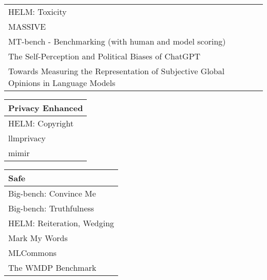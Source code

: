 \documentclass[fleqn]{article}
\begin{document}
\begin{table}[H]
\begin{tabular}{l}
		HELM: Toxicity \\
		MASSIVE \\
		MT-bench - Benchmarking (with human and model scoring) \\
		The Self-Perception and Political Biases of ChatGPT \\
		Towards Measuring the Representation of Subjective Global Opinions in Language Models \\
		\bottomrule
	\end{tabular}
	\newline
	\vspace{10pt}
	\newline
	\begin{tabular}{l}
		\toprule
		Privacy Enhanced \\
		\midrule
		HELM: Copyright\\
		llmprivacy \\
		mimir \\
	\bottomrule
	\end{tabular}
	\newline
	\vspace{10pt}
	\newline	
	\begin{tabular}{l}
		\toprule
		Safe \\
		\midrule
			Big-bench: Convince Me \\
			Big-bench: Truthfulness \\
			HELM: Reiteration, Wedging \\
			Mark My Words \\
			MLCommons \\
			The WMDP Benchmark \\
		\bottomrule
	\end{tabular}	
\end{table}	

\pagebreak 
\end{document}
